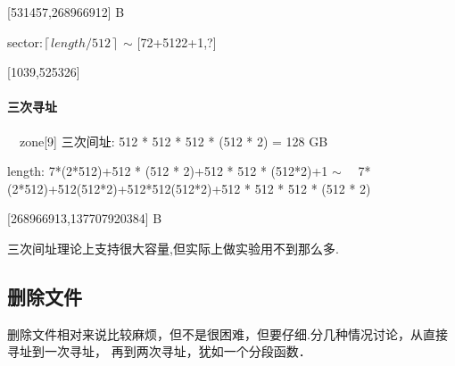  	[531457,268966912] B

 sector:$\left\lceil{length/512}\right\rceil$  $\sim$    [72+5122+1,?]	

 	[1039,525326]

\paragraph{三次寻址}　zone[9] 三次间址: 512 * 512 * 512 * (512 * 2) = 128 GB 

 length: 7*(2*512)+512 * (512 * 2)+512 * 512 * (512*2)+1 $\sim$ 　7*(2*512)+512(512*2)+512*512(512*2)+512 * 512 * 512 * (512 * 2)

[268966913,137707920384] B

三次间址理论上支持很大容量,但实际上做实验用不到那么多.

\subsection{删除文件}

删除文件相对来说比较麻烦，但不是很困难，但要仔细.分几种情况讨论，从直接寻址到一次寻址，
再到两次寻址，犹如一个分段函数．

